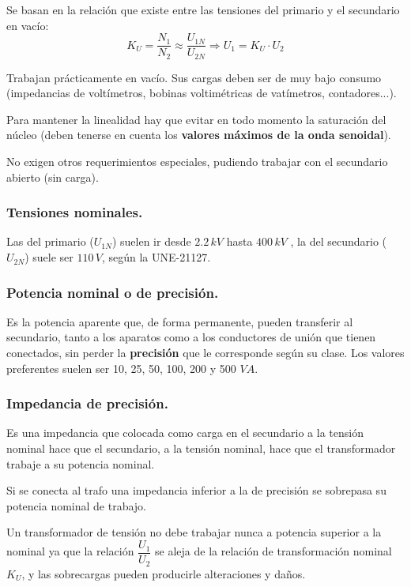 			Se basan en la relación que existe entre las tensiones del
			primario y el secundario en vacío:
			\[K_U=\dfrac{N_1}{N_2}\approx \dfrac{U_{1N}}{U_{2N}} \Rightarrow U_1=K_U\cdot U_2 \]
			
			
			Trabajan prácticamente en vacío. Sus cargas deben ser de
			muy bajo consumo (impedancias de voltímetros, bobinas
			voltimétricas de vatímetros, contadores...).
		
			
			Para mantener la linealidad hay que evitar en todo momento la saturación del núcleo (deben tenerse en cuenta los \textbf{valores máximos de la onda senoidal}).
			
			
			No exigen otros requerimientos especiales, pudiendo
			trabajar con el secundario abierto (sin carga).
			
			\subsubsection*{Tensiones nominales.}
				Las del primario ($U_{1N}$) suelen ir desde $2.2\,kV$ hasta $400\,kV$ , la del secundario ($U_{2N}$) suele ser $110\,V$, según la UNE-21127.
				
			\subsubsection*{Potencia nominal o de precisión.}
				Es la potencia aparente que, de forma permanente, pueden transferir al secundario, tanto a los aparatos como a los conductores de unión que tienen conectados, sin perder la \textbf{precisión} que le corresponde según su clase. Los valores preferentes suelen ser 10, 25, 50, 100, 200 y 500 $VA$.
				
			\subsubsection*{Impedancia de precisión.}
				Es una impedancia que colocada como carga en el
				secundario a la tensión nominal hace que el
				secundario, a la tensión nominal, hace que el
				transformador trabaje a su potencia nominal.
				
				
				Si se conecta al trafo una impedancia inferior a la de
				precisión se sobrepasa su potencia nominal de trabajo.
				
				Un transformador de tensión no debe trabajar nunca a
				potencia superior a la nominal ya que la relación $\dfrac{U_1}{U_2}$ se aleja de la relación de transformación nominal $K_U$, y las sobrecargas pueden producirle alteraciones y daños.
				
